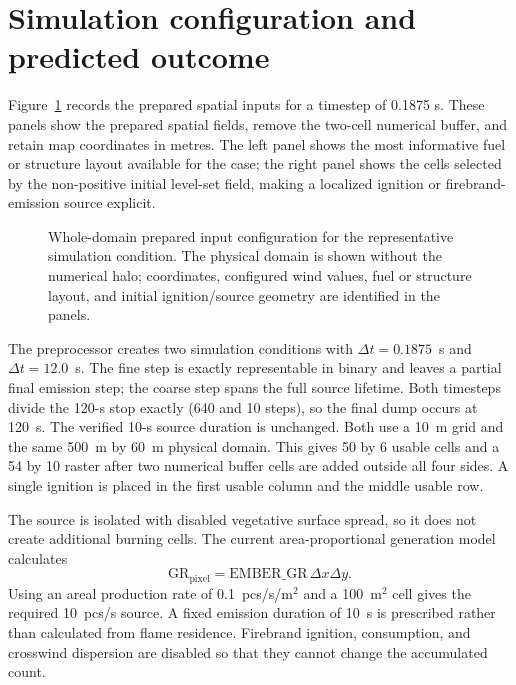\section{Simulation configuration and predicted outcome}

Figure~\ref{fig:input-configuration} records the prepared spatial inputs for a timestep of 0.1875 s.
These panels show the prepared spatial fields, remove the
two-cell numerical buffer, and retain map coordinates in metres.  The left panel shows
the most informative fuel or structure layout available for the case; the right panel
shows the cells selected by the non-positive initial level-set field, making a localized
ignition or firebrand-emission source explicit.

\begin{figure}[H]
\centering
{}
\caption{Whole-domain prepared input configuration for the representative simulation condition.  The
physical domain is shown without the numerical halo; coordinates, configured wind values,
fuel or structure layout, and initial ignition/source geometry are identified in the panels.}
\label{fig:input-configuration}
\end{figure}

The preprocessor creates two simulation conditions with $\Delta t=0.1875$~s and
$\Delta t=12.0$~s. The fine step is exactly representable in binary and leaves a partial final emission step; the coarse step spans the full source lifetime. Both timesteps divide the 120-s stop exactly (640 and 10 steps), so the final dump occurs at 120~s. The verified 10-s source duration is unchanged. Both use a 10~m grid and the same 500~m by 60~m physical
domain. This gives 50 by 6 usable cells and a 54 by 10 raster after two numerical buffer cells are added outside all four sides. A single
ignition is placed in the first usable column and the middle usable row.

The source is isolated with disabled vegetative surface spread, so it does not
create additional burning cells. The current area-proportional generation
model calculates
\[
  \mathrm{GR}_{\mathrm{pixel}}
  =\mathrm{EMBER\_GR}\,\Delta x\Delta y.
\]
Using an areal production rate of 0.1~pcs/s/m$^2$ and a 100~m$^2$ cell gives the
required 10~pcs/s source. A fixed emission duration of 10~s is prescribed rather
than calculated from flame residence. Firebrand ignition, consumption, and crosswind
dispersion are disabled so that they cannot change the accumulated count.

